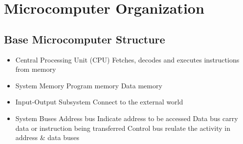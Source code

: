 \renewcommand{\arraystretch}{0.6}
\section{Microcomputer Organization}
\vspace{-0.3cm}
\subsection{Base Microcomputer Structure}
\begin{minipage}{0.7\linewidth}
\begin{itemize}
    \item Central Processing Unit (CPU)
        \subitem Fetches, decodes and executes instructions from memory
    \item System Memory
        \subitem Program memory
        \subitem Data memory 
    \item Input-Output Subsystem
        \subitem Connect to the external world
    \item System Buses 
        \subitem Address bus
            \subsubitem Indicate address to be accessed
        \subitem Data bus
            \subsubitem carry data or instruction being transferred
        \subitem Control bus 
            \subsubitem reulate the activity in address \& data buses 
\end{itemize}
\end{minipage}
